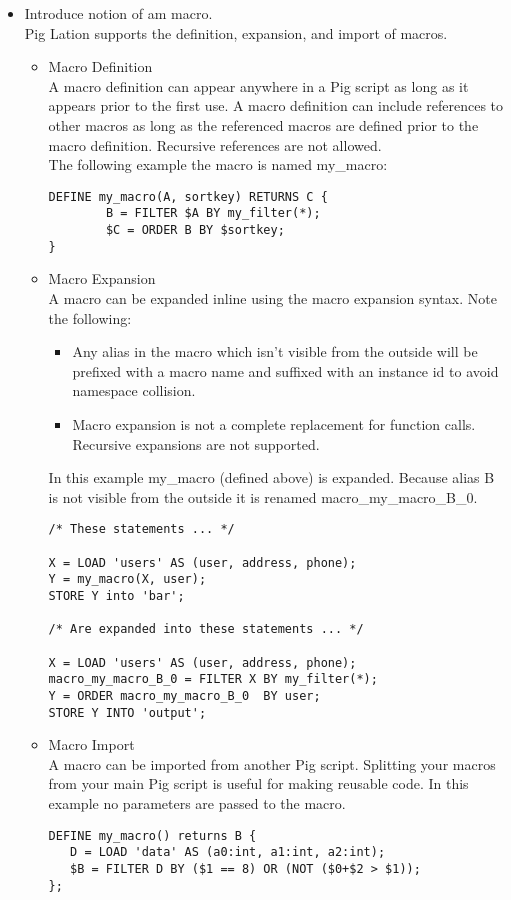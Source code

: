 \documentclass[12pt]{article}
\begin{document}
	\begin{itemize}
		\item Introduce notion of am macro.\\
		Pig Lation supports the definition, expansion, and import of macros.
		\begin{itemize}
			\item Macro Definition\\
			A macro definition can appear anywhere in a Pig script as long as it appears prior to the first use. A macro definition can include references to other macros as long as the referenced macros are defined prior to the macro definition. Recursive references are not allowed.\\
			The following example the macro is named my\_macro:
			\begin{lstlisting}
DEFINE my_macro(A, sortkey) RETURNS C {
    	B = FILTER $A BY my_filter(*);
    	$C = ORDER B BY $sortkey;
}
			\end{lstlisting}
			
			\item Macro Expansion\\
			A macro can be expanded inline using the macro expansion syntax. Note the following:
			\begin{itemize}
				\item Any alias in the macro which isn't visible from the outside will be prefixed with a macro name and suffixed with an instance id to avoid namespace collision.
				\item Macro expansion is not a complete replacement for function calls. Recursive expansions are not supported.
			\end{itemize}
			In this example my\_macro (defined above) is expanded. Because alias B is not visible from the outside it is renamed macro\_my\_macro\_B\_0.
			\begin{lstlisting}
/* These statements ... */

X = LOAD 'users' AS (user, address, phone);
Y = my_macro(X, user);
STORE Y into 'bar';

/* Are expanded into these statements ... */

X = LOAD 'users' AS (user, address, phone);
macro_my_macro_B_0 = FILTER X BY my_filter(*);
Y = ORDER macro_my_macro_B_0  BY user;
STORE Y INTO 'output';
			\end{lstlisting}
			\item Macro Import\\
			A macro can be imported from another Pig script. Splitting your macros from your main Pig script is useful for making reusable code.
			In this example no parameters are passed to the macro.
			\begin{lstlisting}
DEFINE my_macro() returns B {
   D = LOAD 'data' AS (a0:int, a1:int, a2:int);   
   $B = FILTER D BY ($1 == 8) OR (NOT ($0+$2 > $1));
};


\end{lstlisting}
\end{itemize}
\end{itemize}
\end{document}
